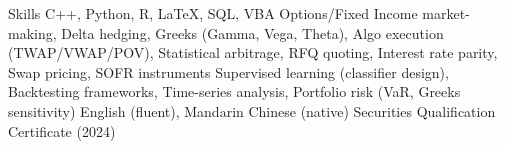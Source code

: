 
\begin{rubric}{Skills}
\entry*[Programming]%
	C++, Python, R, \LaTeX, SQL, VBA
%
	Options/Fixed Income market-making, Delta hedging, Greeks (Gamma, Vega, Theta),
	Algo execution (TWAP/VWAP/POV), Statistical arbitrage, RFQ quoting,
	Interest rate parity, Swap pricing, SOFR instruments
\entry*[ML / Data]%
	Supervised learning (classifier design), Backtesting frameworks,
	Time-series analysis, Portfolio risk (VaR, Greeks sensitivity)
\entry*[Languages]%
	English (fluent), Mandarin Chinese (native)
\entry*[Certifications]%
	Securities Qualification Certificate (2024)
\end{rubric}